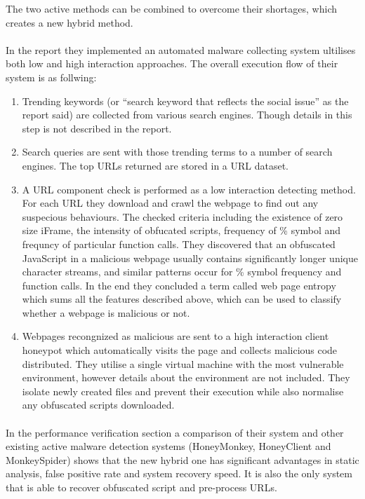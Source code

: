 The two active methods can be combined to overcome their shortages, which 
creates a new hybrid method. 
\paragraph{}
In the report they implemented an automated malware collecting system 
ultilises both low and high interaction approaches. The overall execution flow 
of their system is as follwing:
\begin{enumerate}
\item Trending keywords (or ``search keyword that reflects the social issue'' 
as the report said) are collected from various search engines. Though details 
in this step is not described in the report. 
\item Search queries are sent with those trending terms to a number of search 
engines. The top URLs returned are stored in a URL dataset. 
\item A URL component check is performed as a low interaction detecting 
method. For each URL they download and crawl the webpage to find out any 
suspecious behaviours. The checked criteria including the existence of zero 
size iFrame, the intensity of obfucated scripts, frequency of \% symbol and 
frequncy of particular function calls. They discovered that an 
obfuscated JavaScript in a malicious webpage usually contains significantly 
longer unique character streams, and similar patterns occur for \% symbol 
frequency and function calls. In the end they concluded a term called web page 
entropy which sums all the features described above, which can be used to 
classify whether a webpage is malicious or not. 
\item Webpages recongnized as malicious are sent to a high interaction client 
honeypot which automatically visits the page and collects malicious code 
distributed. They utilise a single virtual machine with the most vulnerable 
environment, however details about the environment are not included. They 
isolate newly created files and prevent their execution while also normalise 
any obfuscated scripts downloaded. 
\end{enumerate} 
\paragraph{}
In the performance verification section a comparison of 
their system and other existing active malware detection systems (HoneyMonkey, 
HoneyClient and MonkeySpider) shows that the new hybrid one has significant 
advantages in static analysis, false positive rate and system recovery speed. 
It is also the only system that is able to recover obfuscated script and 
pre-process URLs. 
